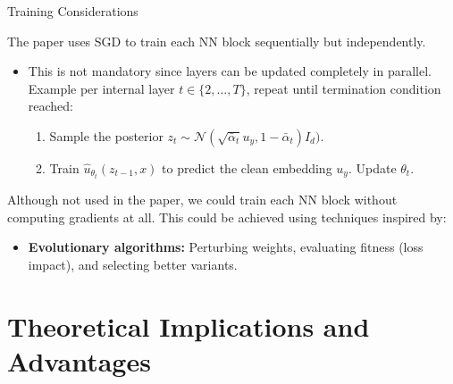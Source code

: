 \documentclass{beamer}
\begin{document}
\begin{frame}{Training Considerations}

        The paper uses SGD to train each NN block sequentially but independently.
               \begin{itemize}
        \item This is not mandatory since layers can be updated completely in parallel. Example per internal layer $t \in \{2, \dots, T\}$, repeat until termination condition reached:
        
        \begin{enumerate}
          \item Sample the posterior $z_{t} \sim \mathcal{N} (\sqrt{\bar{\alpha}_t}u_y, 1-\bar{\alpha}_t)I_d)$.
          \item Train $\hat u_{\theta_t}(z_{t-1},x)$ to predict the clean embedding $u_y$. Update $\theta_t$.

\end{enumerate} 
        \end{itemize}
        
        Although not used in the paper, we could train each NN block without computing gradients at all. This could be achieved using techniques inspired by:
        \begin{itemize}
            \item \textbf{Evolutionary algorithms:} Perturbing weights, evaluating fitness (loss impact), and selecting better variants.
        \end{itemize}

\end{frame}

\section{Theoretical Implications and Advantages}
\end{document}
